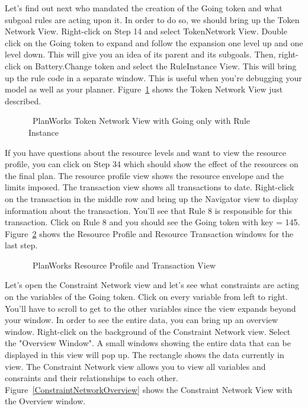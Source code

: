 \documentclass[10pt, letterpaper, twoside]{article}
\begin{document}
Let's find out next who mandated the creation of the Going token and what
subgoal rules are acting upon it.  In order to do so, we should bring up
the Token Network View.  Right-click on Step 14 and select TokenNetwork
View. Double click on the Going token to expand and follow the expansion
one level up and one level down.  This will give you an idea of its parent
and its subgoals.  Then, right-click on Battery.Change token and select the
RuleInstance View.  This will bring up the rule code in a separate window.
This is useful when you're debugging your model as well as your planner.
Figure~\ref{TokenNetwork-RuleInstance} shows the Token Network View
just described.



\begin{figure}[htb]
\centering{}
\caption{\ET\, PlanWorks Token Network View with Going only with Rule Instance}
\label{TokenNetwork-RuleInstance}
\end{figure}

If you have questions about the resource levels and want to view the
resource profile, you can click on Step 34 which should show the effect of
the resources on the final plan. The resource profile view shows the
resource envelope and the limits imposed. The transaction view shows all
transactions to date.  Right-click on the transaction in the middle row and
bring up the Navigator view to display information about the transaction.
You'll see that Rule 8 is responsible for this transaction.  Click on Rule
8 and you should see the Going token with key = 145.
Figure~\ref{ResourceOverview} shows the Resource Profile and Resource
Transaction windows for the last step.

\begin{figure}[h]
\centering{}
\caption{\ET\, PlanWorks Resource Profile and Transaction View}
\label{ResourceOverview}
\end{figure}

Let's open the Constraint Network view and let's see what constraints are
acting on the variables of the Going token. Click on every variable from
left to right.  You'll have to scroll to get to the other variables since
the view expands beyond your window.  In order to see the entire data, you
can bring up an overview window.  Right-click on the background of the
Constraint Network view.  Select the "Overview Window".  A small windows
showing the entire data that can be displayed in this view will pop up.
The rectangle shows the data currently in view.  The Constraint Network
view allows you to view all variables and consraints and their
relationships to each other.  Figure~\ref{ConstraintNetworkOverview} shows
the Constraint Network View with the Overview window.
\end{document}
